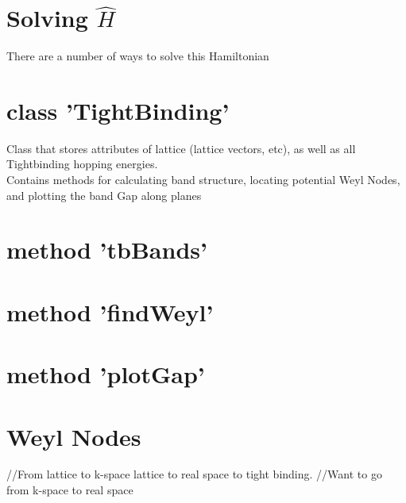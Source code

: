 \documentclass{article}
\begin{document}
\section*{Solving $\hat H$}
There are a number of ways to solve this Hamiltonian
\section*{class 'TightBinding'}
Class that stores attributes of lattice (lattice vectors, etc), as well as all Tightbinding hopping energies.\\
Contains methods for calculating band structure, locating potential Weyl Nodes, and plotting the band Gap along planes
\section*{method 'tbBands'}

\section*{method 'findWeyl'}	

\section*{method 'plotGap'}

\section*{Weyl Nodes}
//From lattice to k-space lattice to real space to tight binding.
//Want to go from k-space to real space
\end{document}
